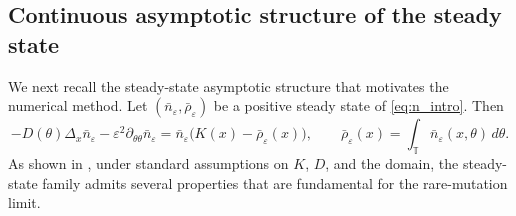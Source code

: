 \documentclass[11pt]{article}
\begin{document}
\subsection{Continuous asymptotic structure of the steady state}\label{subsec:continuous_asymptotic_structure}

We next recall the steady-state asymptotic structure that motivates the numerical method. Let \((\bar n_\varepsilon,\bar \rho_\varepsilon)\) be a positive steady state of \eqref{eq:n_intro}. Then
\begin{equation}\label{eq:ss_n}
-D(\theta)\Delta_x \bar n_\varepsilon
-\varepsilon^2\partial_{\theta\theta} \bar n_\varepsilon
=
\bar n_\varepsilon\bigl(K(x)-\bar\rho_\varepsilon(x)\bigr),
\qquad
\bar\rho_\varepsilon(x)=\int_{\mathbb T} \bar n_\varepsilon(x,\theta)\,d\theta.
\end{equation}
As shown in \cite{PerthameSouganidis}, under standard assumptions on \(K\), \(D\), and the domain, the steady-state family admits several properties that are fundamental for the rare-mutation limit.
\end{document}
